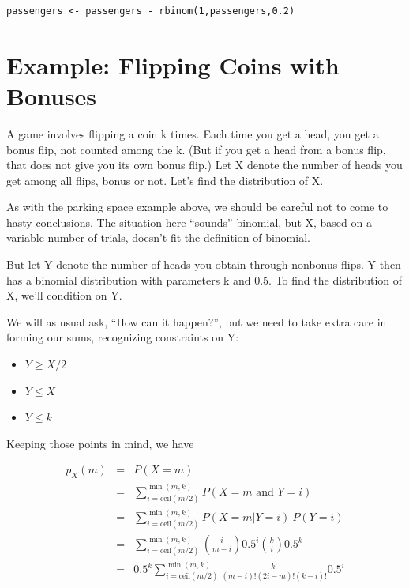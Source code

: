 \begin{lstlisting}
passengers <- passengers - rbinom(1,passengers,0.2)
\end{lstlisting}

\section{Example:  Flipping Coins with Bonuses}
\label{bonusflip}

A game involves flipping a coin k times.  Each time you get a head, you
get a bonus flip, not counted among the k.  (But if you get a head from
a bonus flip, that does not give you its own bonus flip.) Let X denote
the number of heads you get among all flips, bonus or not.  Let's find
the distribution of X.

As with the parking space example above, we should be careful not to
come to hasty conclusions.  The situation here ``sounds'' binomial, but
X, based on a variable number of trials, doesn't fit the definition of
binomial.

But let Y denote the number of heads you obtain through
nonbonus flips.  Y then has a binomial distribution with parameters k
and 0.5.  To find the distribution of X, we'll condition on Y.  

We will as usual ask, ``How can it happen?'', but we need to take extra
care in forming our sums, recognizing constraints on Y:

\begin{itemize}

\item $Y \geq X/2$

\item $Y \leq X$

\item $Y \leq k$

\end{itemize}

Keeping those points in mind, we have

\begin{eqnarray}
p_X(m) &=& P(X = m) \\ 
&=& \sum_{i=\textrm{ceil}(m/2)}^{\min(m,k)} 
   P(X = m \textrm{ and } Y = i) \\
&=& \sum_{i=\textrm{ceil}(m/2)}^{\min(m,k)} 
   P(X = m | Y = i) ~ P(Y = i)\\
&=& \sum_{i=\textrm{ceil}(m/2)}^{\min(m,k)} 
   \binom{i}{m-i} 0.5^i \binom{k}{i} 0.5^k \\
&=& 0.5^k \sum_{i=\textrm{ceil}(m/2)}^{\min(m,k)} 
   \frac{k!}{(m-i)!(2i-m)!(k-i)!} 0.5^i
\end{eqnarray}

